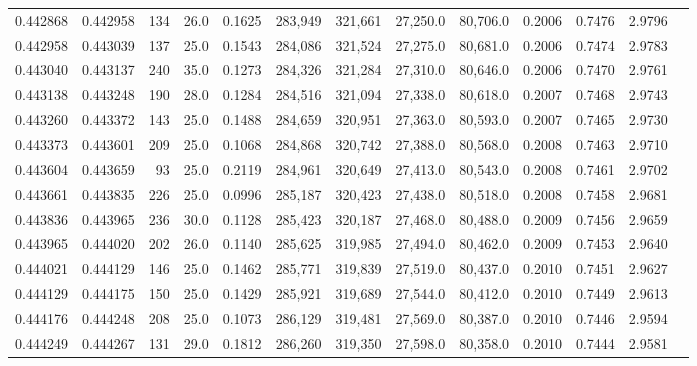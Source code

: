 \begin{tabular}{rrrrrrrrrrrrr}
0.442868 & 0.442958 &   134 & 26.0 &                                     0.1625 & 283,949 & 321,661 &  27,250.0 &  80,706.0 & 0.2006 & 0.7476 & 2.9796 \\
0.442958 & 0.443039 &   137 & 25.0 &                                     0.1543 & 284,086 & 321,524 &  27,275.0 &  80,681.0 & 0.2006 & 0.7474 & 2.9783 \\
0.443040 & 0.443137 &   240 & 35.0 &                                     0.1273 & 284,326 & 321,284 &  27,310.0 &  80,646.0 & 0.2006 & 0.7470 & 2.9761 \\
0.443138 & 0.443248 &   190 & 28.0 &                                     0.1284 & 284,516 & 321,094 &  27,338.0 &  80,618.0 & 0.2007 & 0.7468 & 2.9743 \\
0.443260 & 0.443372 &   143 & 25.0 &                                     0.1488 & 284,659 & 320,951 &  27,363.0 &  80,593.0 & 0.2007 & 0.7465 & 2.9730 \\
0.443373 & 0.443601 &   209 & 25.0 &                                     0.1068 & 284,868 & 320,742 &  27,388.0 &  80,568.0 & 0.2008 & 0.7463 & 2.9710 \\
0.443604 & 0.443659 &    93 & 25.0 &                                     0.2119 & 284,961 & 320,649 &  27,413.0 &  80,543.0 & 0.2008 & 0.7461 & 2.9702 \\
0.443661 & 0.443835 &   226 & 25.0 &                                     0.0996 & 285,187 & 320,423 &  27,438.0 &  80,518.0 & 0.2008 & 0.7458 & 2.9681 \\
0.443836 & 0.443965 &   236 & 30.0 &                                     0.1128 & 285,423 & 320,187 &  27,468.0 &  80,488.0 & 0.2009 & 0.7456 & 2.9659 \\
0.443965 & 0.444020 &   202 & 26.0 &                                     0.1140 & 285,625 & 319,985 &  27,494.0 &  80,462.0 & 0.2009 & 0.7453 & 2.9640 \\
0.444021 & 0.444129 &   146 & 25.0 &                                     0.1462 & 285,771 & 319,839 &  27,519.0 &  80,437.0 & 0.2010 & 0.7451 & 2.9627 \\
0.444129 & 0.444175 &   150 & 25.0 &                                     0.1429 & 285,921 & 319,689 &  27,544.0 &  80,412.0 & 0.2010 & 0.7449 & 2.9613 \\
0.444176 & 0.444248 &   208 & 25.0 &                                     0.1073 & 286,129 & 319,481 &  27,569.0 &  80,387.0 & 0.2010 & 0.7446 & 2.9594 \\
0.444249 & 0.444267 &   131 & 29.0 &                                     0.1812 & 286,260 & 319,350 &  27,598.0 &  80,358.0 & 0.2010 & 0.7444 & 2.9581 \\

\end{tabular}
